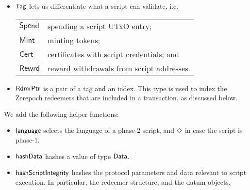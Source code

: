 \begin{itemize}
  \item $\mathsf{Tag}$ lets us differentiate what a script
  can validate, i.e. \\
  \begin{tabular}{l@{~to validate~}l}
  $\mathsf{Spend}$ & spending a script UTxO entry; \\
  $\mathsf{Mint}$ & minting tokens; \\
  $\mathsf{Cert}$  & certificates with script credentials; and  \\
  $\mathsf{Rewrd}$ & reward withdrawals from script addresses.
  \end{tabular}

  \item $\mathsf{RdmrPtr}$ is a pair of a tag and an index. This type is
  used to index the Zerepoch redeemers that are included in a transaction, as discussed
  below.

\end{itemize}

We add the following helper functions:

\begin{itemize}
  \item $\mathsf{language}$ selects the language of a phase-2 script, and $\Diamond$ in case
  the script is phase-1.
  \item $\mathsf{hashData}$ hashes a value of type $\mathsf{Data}$.
  \item $\mathsf{hashScriptIntegrity}$ hashes the protocol parameters and data relevant to script execution.
  In particular, the redeemer structure, and the datum objects.
\end{itemize}

